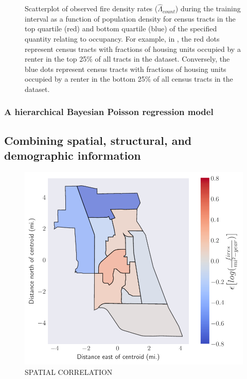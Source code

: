 \documentclass{svjour3}
\begin{document}
\begin{figure}[!htb]
\begin{center}
{          } %
      \end{center}
      \caption{Scatterplot of observed fire density rates ($\hat\Lambda_{count}$) during the training interval as a function of population density for census tracts in the top quartile (red) and bottom quartile (blue) of the specified quantity relating to occupancy. For example, in \protect{}, the red dots represent census tracts with fractions of housing units occupied by a renter in the top 25\% of all tracts in the dataset. Conversely, the blue dots represent census tracts with fractions of housing units occupied by a renter in the bottom 25\% of all census tracts in the dataset.}
     \label{fig:occupancy}
  \end{figure}
 
  \subsubsection{A hierarchical Bayesian Poisson regression model}
  
  
  \subsection{Combining spatial, structural, and demographic information}
  
  
  
\begin{figure}[htb] \centering
\includegraphics[width=.5\textwidth]{figures/spatial_correlation.pdf}
\caption{SPATIAL CORRELATION}
\label{fig:spatialcorr}
\end{figure}
  
\end{document}
